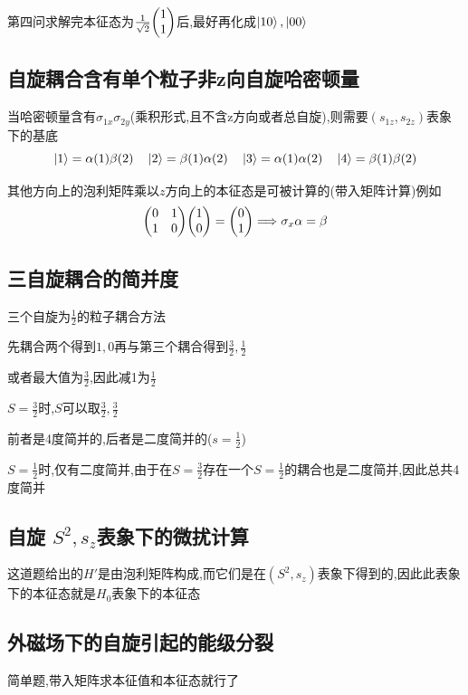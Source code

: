 \documentclass{article}
\begin{document}
            第四问求解完本征态为$\frac{1}{\sqrt{2}}\mqty(1 \\ 1)$后,最好再化成$\ket{10},\ket{00}$

        \subsection{自旋耦合含有单个粒子非z向自旋哈密顿量}
            当哈密顿量含有$\sigma_{1x} \sigma_{2y}$(乘积形式,且不含z方向或者总自旋),则需要$(s_{1z},s_{2z})$表象下的基底
            $$
            \ket{1} = \alpha(1)\beta(2) \quad \ket{2} = \beta(1)\alpha(2) \quad \ket{3} = \alpha(1)\alpha(2) \quad  
            \ket{4} = \beta(1)\beta(2)  
            $$

            其他方向上的泡利矩阵乘以$z$方向上的本征态是可被计算的(带入矩阵计算)例如
            $$
            \mqty( 0 & 1 \\ 1 & 0 ) \mqty( 1 \\ 0 ) = \mqty( 0 \\ 1) \lra \sigma_{x}\alpha = \beta
            $$


        \subsection{三自旋耦合的简并度}
            \begin{formal}
                三个自旋为$\frac{1}{2}$的粒子耦合方法

                先耦合两个得到$1,0$再与第三个耦合得到$\frac{3}{2},\frac{1}{2}$

                或者最大值为$\frac{3}{2}$,因此减1为$\frac{1}{2}$
            \end{formal}

            $S = \frac{3}{2}$时,$ S $可以取$\frac{3}{2},\frac{3}{2}$
            
            前者是4度简并的,后者是二度简并的($s=\frac{1}{2}$)

            $S = \frac{1}{2}$时,仅有二度简并,由于在$S=\frac{3}{2}$存在一个$S=\frac{1}{2}$的耦合也是二度简并,因此总共4度简并

        \subsection{自旋 \texorpdfstring{$S^{2},s_{z}$}{}表象下的微扰计算}
            这道题给出的$H'$是由泡利矩阵构成,而它们是在$(S^{2},s_{z})$表象下得到的,因此此表象下的本征态就是$H_{0}$表象下的本征态

        \subsection{外磁场下的自旋引起的能级分裂}
            简单题,带入矩阵求本征值和本征态就行了
        
\end{document}
